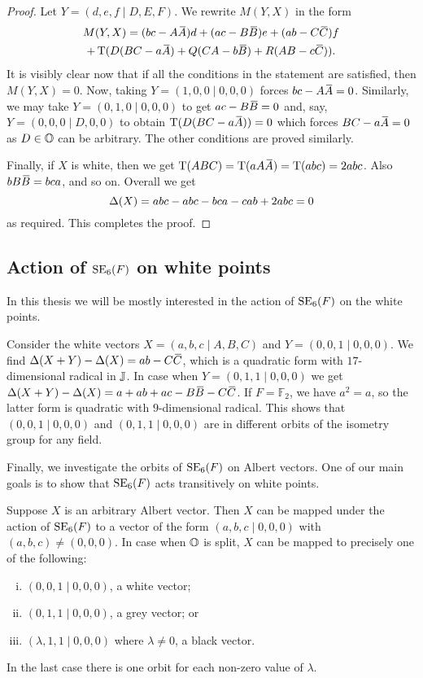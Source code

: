 \begin{proof}
	Let $Y = (d,e,f\mid D,E,F)$. We rewrite $M(Y,X)$ in the form
	\begin{multline*}
		M(Y,X) = (bc - A \ovA)d + (ac - B \ovB) e + (ab - C \ovC) f \\
			+ \Tr(D(BC-a\ovA) + Q(CA - b\ovB) + R(AB - c\ovC)).
	\end{multline*}
It is visibly clear now that if all the conditions in the statement are satisfied,
then $M(Y,X) = 0$. Now, taking $Y = (1,0,0\mid 0,0,0)$ forces
$bc-A\mathord{\mbox{\hspace*{0pt}}\,\overline{\!A\!\!\;}\!\:}\mbox{\hspace*{0pt}} = 0$. Similarly, we may take $Y = (0,1,0\mid 0,0,0)$ to get 
$ac - B\mathord{\mbox{\hspace*{0pt}}\,\overline{\!B\!\!\;}\!\:}\mbox{\hspace*{0pt}} = 0$ and, say, $Y = (0,0,0\mid D,0,0)$ to obtain
$\operatorname{T}(D(BC - a\mathord{\mbox{\hspace*{0pt}}\,\overline{\!A\!\!\;}\!\:}\mbox{\hspace*{0pt}})) = 0$ which forces $BC - a\mathord{\mbox{\hspace*{0pt}}\,\overline{\!A\!\!\;}\!\:}\mbox{\hspace*{0pt}} = 0$ as $D \in \mathbb{O}$ can
be arbitrary. The other conditions are proved similarly.

Finally, if $X$ is white, then we get $\operatorname{T}(ABC) = \operatorname{T}(a A\mathord{\mbox{\hspace*{0pt}}\,\overline{\!A\!\!\;}\!\:}\mbox{\hspace*{0pt}}) = \operatorname{T}(abc) = 2abc$. 
Also $b B\mathord{\mbox{\hspace*{0pt}}\,\overline{\!B\!\!\;}\!\:}\mbox{\hspace*{0pt}} = bca$, and so on. Overall we get 
\begin{equation*}
	\Delta(X) = abc - abc - bca - cab + 2abc = 0
\end{equation*}
as required. This completes the proof.
\end{proof}

\subsection{Action of $\mathrm{SE}_6(F)$ on white points}

In this thesis we will be mostly interested in the action of $\mathrm{SE}_6(F)$ on the 
white points. 

Consider the white vectors $X = (a,b,c\mid A,B,C)$ and $Y = (0,0,1\mid 0,0,0)$. We find 
\mbox{$\Delta(X+Y) - \Delta(X) = ab - C\mathord{\mbox{\hspace*{0pt}}\,\overline{\!C\!\!\;}\!\:}\mbox{\hspace*{0pt}}$}, which is a quadratic form with 
\mbox{$17$-dimensional} radical in $\mathbb{J}$. In case when $Y = (0,1,1\mid 0,0,0)$ we get
$\Delta(X+Y) - \Delta(X) = a+ab+ac-B\ovB-C\ovC$. If $F = \mathbb{F}_2$, 
we have $a^2 = a$, so the latter form is quadratic with $9$-dimensional radical. This
shows that $(0,0,1\mid 0,0,0)$ and $(0,1,1\mid 0,0,0)$ are in different orbits 
of the isometry group for any field.

Finally, we investigate the orbits of $\mathrm{SE}_6(F)$ on Albert vectors. One of our main
goals is to show that $\mathrm{SE}_6(F)$ acts transitively on white points. 

\begin{lemma}
	Suppose $X$ is an arbitrary Albert vector. Then $X$ can be mapped under the action
	of $\mathrm{SE}_6(F)$ to a vector of the form $(a,b,c\mid 0,0,0)$ with $(a,b,c) \neq 
	(0,0,0)$. In case when $\mathbb{O}$ is split, $X$ can be mapped to precisely one of the
	 following:
	\begin{enumerate}[(i)]
		\item $(0,0,1\mid 0,0,0)$, a white vector;
		\item $(0,1,1\mid 0,0,0)$, a grey vector; or
		\item $(\lambda,1,1\mid 0,0,0)$ where $\lambda \neq 0$, a black vector.
	\end{enumerate}
	In the last case there is one orbit for each non-zero value of $\lambda$. 
\end{lemma}

